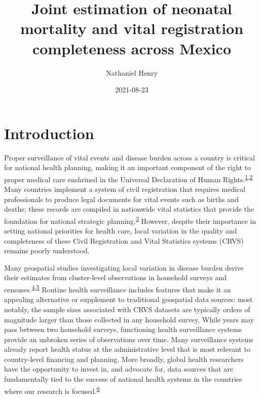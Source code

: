 \documentclass[
]{article}
\title{Joint estimation of neonatal mortality and vital registration completeness across Mexico}
\author{Nathaniel Henry\textsuperscript{}}
\date{2021-08-23}
\begin{document}
\maketitle

\hypertarget{introduction}{%
\section{Introduction}\label{introduction}}

Proper surveillance of vital events and disease burden across a country is critical for national health planning, making it an important component of the right to proper medical care enshrined in the Universal Declaration of Human Rights.\textsuperscript{\protect\hyperlink{ref-Mikkelsen2010}{1},\protect\hyperlink{ref-srs}{2}} Many countries implement a system of civil registration that requires medical professionals to produce legal documents for vital events such as births and deaths; these records are compiled in nationwide vital statistics that provide the foundation for national strategic planning.\textsuperscript{\protect\hyperlink{ref-Abouzahr2005}{3}} However, despite their importance in setting national priorities for health care, local variation in the quality and completeness of these Civil Registration and Vital Statistics systems (CRVS) remains poorly understood.

Many geospatial studies investigating local variation in disease burden derive their estimates from cluster-level observations in household surveys and censuses.\textsuperscript{\protect\hyperlink{ref-Diggle2016}{4},\protect\hyperlink{ref-Wakefield2020}{5}} Routine health surveillance includes features that make it an appealing alternative or supplement to traditional geospatial data sources: most notably, the sample sizes associated with CRVS datasets are typically orders of magnitude larger than those collected in any household survey. While years may pass between two household surveys, functioning health surveillance systems provide an unbroken series of observations over time. Many surveillance systems already report health status at the administrative level that is most relevant to country-level financing and planning. More broadly, global health researchers have the opportunity to invest in, and advocate for, data sources that are fundamentally tied to the success of national health systems in the countries where our research is focused.\textsuperscript{\protect\hyperlink{ref-AbouZahr2015}{6}}
\end{document}
